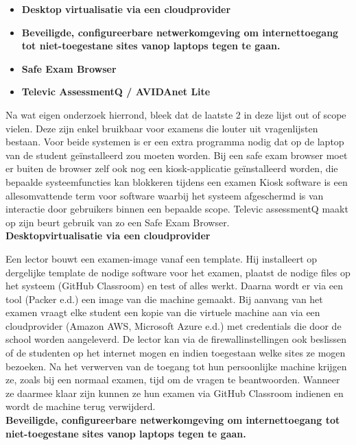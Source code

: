\documentclass[a0,portrait]{a0poster}
\begin{document}
\begin{multicols}{2}
\begin{itemize} 
	\item \textbf{Desktop virtualisatie via een cloudprovider}
	\item \textbf{Beveiligde, configureerbare netwerkomgeving om internettoegang tot niet-toegestane sites vanop laptops tegen te gaan.	}
	\item \textbf{Safe Exam Browser }
	\item \textbf{Televic AssessmentQ / AVIDAnet Lite}
\end{itemize}
\bigskip
 Na wat eigen onderzoek hierrond, bleek dat de laatste 2 in deze lijst  out of scope vielen. Deze zijn enkel bruikbaar voor examens die louter uit vragenlijsten bestaan. Voor beide systemen is er een extra programma nodig dat op de laptop van de student ge\"{i}nstalleerd zou moeten worden. Bij een safe exam browser moet er buiten de browser zelf ook nog een kiosk-applicatie ge\"{i}nstalleerd worden, die bepaalde systeemfuncties kan blokkeren tijdens een examen  Kiosk software is een allesomvattende term voor software waarbij het systeem afgeschermd is van interactie door gebruikers binnen een bepaalde scope. Televic assessmentQ maakt op zijn beurt gebruik van zo een Safe Exam Browser. \\

\textbf{Desktopvirtualisatie via een cloudprovider}

Een lector bouwt een examen-image vanaf een template. Hij installeert op dergelijke template de nodige software voor het examen, plaatst de nodige files op het systeem (GitHub Classroom) en test of alles werkt.  Daarna wordt er via een tool (Packer e.d.) een image van die machine gemaakt.  Bij aanvang van het examen vraagt elke student een kopie van die virtuele machine aan via een cloudprovider (Amazon AWS, Microsoft Azure e.d.) met credentials die door de school worden aangeleverd. De lector kan via de firewallinstellingen ook beslissen of de studenten op het internet mogen en indien toegestaan welke sites ze mogen bezoeken. Na het verwerven van de toegang tot hun persoonlijke machine krijgen ze, zoals bij een normaal examen, tijd om de vragen te beantwoorden. Wanneer ze daarmee klaar zijn kunnen ze hun examen via GitHub Classroom indienen en wordt de machine terug verwijderd. \\



\textbf{Beveiligde, configureerbare netwerkomgeving om internettoegang tot niet-toegestane sites vanop laptops tegen te gaan.	} 


\end{multicols}
\end{document}
